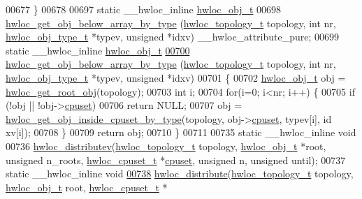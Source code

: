 \begin{DoxyCode}
{{00677 \}
00678 
00697 \textcolor{keyword}{static} \_\_hwloc\_inline \hyperlink{a00016}{hwloc_obj_t}
00698 \hyperlink{a00058_gac33a0990f4e771b2117ddedabc3f00f6}{hwloc_get_obj_below_array_by_type} (\hyperlink{a00039_ga9d1e76ee15a7dee158b786c30b6a6e38}{hwloc_topology_t} topology, \textcolor{keywordtype}{int} nr, 
      \hyperlink{a00041_gacd37bb612667dc437d66bfb175a8dc55}{hwloc_obj_type_t} *typev, \textcolor{keywordtype}{unsigned} *idxv) \_\_hwloc\_attribute\_pure;
00699 \textcolor{keyword}{static} \_\_hwloc\_inline \hyperlink{a00016}{hwloc_obj_t}
\hypertarget{a00031_source_l00700}{}\hyperlink{a00058_gac33a0990f4e771b2117ddedabc3f00f6}{00700} \hyperlink{a00058_gac33a0990f4e771b2117ddedabc3f00f6}{hwloc_get_obj_below_array_by_type} (\hyperlink{a00039_ga9d1e76ee15a7dee158b786c30b6a6e38}{hwloc_topology_t} topology, \textcolor{keywordtype}{int} nr, 
      \hyperlink{a00041_gacd37bb612667dc437d66bfb175a8dc55}{hwloc_obj_type_t} *typev, \textcolor{keywordtype}{unsigned} *idxv)
00701 \{
00702   \hyperlink{a00016}{hwloc_obj_t} obj = \hyperlink{a00053_gadbf58f6e187efbdb3cd9a8e30311b7d7}{hwloc_get_root_obj}(topology);
00703   \textcolor{keywordtype}{int} i;
00704   \textcolor{keywordflow}{for}(i=0; i<nr; i++) \{
00705     \textcolor{keywordflow}{if} (!obj || !obj->\hyperlink{a00016_a67925e0f2c47f50408fbdb9bddd0790f}{cpuset})
00706       \textcolor{keywordflow}{return} NULL;
00707     obj = \hyperlink{a00054_gaa8dcdb85224f7350b90fb0a1ca91e6d6}{hwloc_get_obj_inside_cpuset_by_type}(topology, obj->\hyperlink{a00016_a67925e0f2c47f50408fbdb9bddd0790f}{cpuset}, typev[i], id
      xv[i]);
00708   \}
00709   \textcolor{keywordflow}{return} obj;
00710 \}
00711 
00735 \textcolor{keyword}{static} \_\_hwloc\_inline \textcolor{keywordtype}{void}
00736 \hyperlink{a00059_gaf057d7c5e3cb3df897ce527258537619}{hwloc_distributev}(\hyperlink{a00039_ga9d1e76ee15a7dee158b786c30b6a6e38}{hwloc_topology_t} topology, \hyperlink{a00016}{hwloc_obj_t} *root, \textcolor{keywordtype}{unsigned} n\_roots,
       \hyperlink{a00040_ga4bbf39b68b6f568fb92739e7c0ea7801}{hwloc_cpuset_t} *\hyperlink{a00016_a67925e0f2c47f50408fbdb9bddd0790f}{cpuset}, \textcolor{keywordtype}{unsigned} n, \textcolor{keywordtype}{unsigned} until);
00737 \textcolor{keyword}{static} \_\_hwloc\_inline \textcolor{keywordtype}{void}
\hypertarget{a00031_source_l00738}{}\hyperlink{a00059_ga6d5c88292ad5aa062c1bebc99369c042}{00738} \hyperlink{a00059_ga6d5c88292ad5aa062c1bebc99369c042}{hwloc_distribute}(\hyperlink{a00039_ga9d1e76ee15a7dee158b786c30b6a6e38}{hwloc_topology_t} topology, \hyperlink{a00016}{hwloc_obj_t} root, \hyperlink{a00040_ga4bbf39b68b6f568fb92739e7c0ea7801}{hwloc_cpuset_t} *
}}
\end{DoxyCode}
